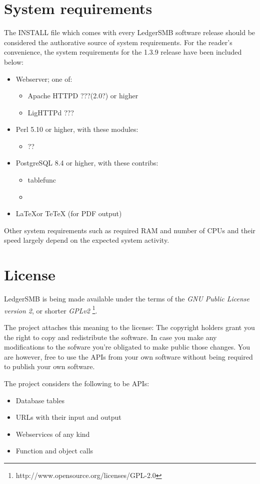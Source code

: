 \section{System requirements}

The INSTALL file which comes with every LedgerSMB software release should be
considered the authorative source of system requirements.  For the reader's
convenience, the system requirements for the 1.3.9 release have been included
below:

\begin{itemize}
\item Webserver; one of:
\begin{itemize}
\item Apache HTTPD ???(2.0?) or higher
\item LigHTTPd ???
\end{itemize}
\item Perl 5.10 or higher, with these modules:
\begin{itemize}
\item ??
\end{itemize}
\item PostgreSQL 8.4 or higher, with these contribs:
\begin{itemize}
\item tablefunc
\item 
\end{itemize}
\item \LaTeX or TeTeX (for PDF output)
\end{itemize}

Other system requirements such as required RAM and number of CPUs and their speed
largely depend on the expected system activity.

\section{License}

LedgerSMB is being made available under the terms of the
\textit{GNU Public License version 2}, or shorter \textit{GPLv2}
\footnote{http://www.opensource.org/licenses/GPL-2.0}.

The project attaches this meaning to the license:
The copyright holders grant you the right to copy and
redistribute the software.  In case you make any modifications to the sofware
you're obligated to make public those changes.  You are however, free to use
the APIs from your own software without being required to publish your own software.

The project considers the following to be APIs:
\begin{itemize}
\item Database tables
\item URLs with their input and output
\item Webservices of any kind
\item Function and object calls
\end{itemize}

